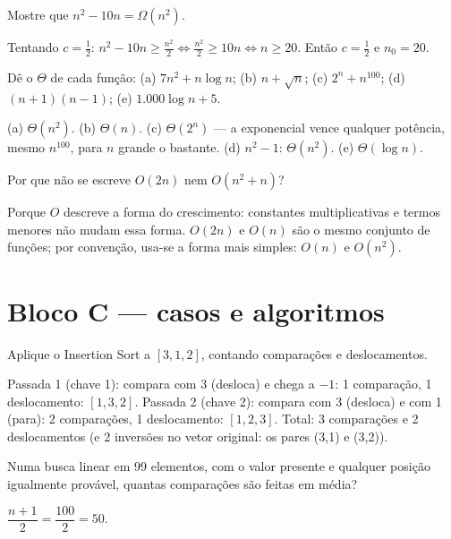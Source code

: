 Mostre que $n^2 - 10n = \Omega(n^2)$.
\begin{resolucao}
Tentando $c = \tfrac{1}{2}$: $n^2 - 10n \ge \tfrac{n^2}{2} \Longleftrightarrow \tfrac{n^2}{2} \ge 10n
\Longleftrightarrow n \ge 20$. Então $c = \tfrac{1}{2}$ e $n_0 = 20$.
\end{resolucao}

Dê o $\Theta$ de cada função: (a) $7n^2 + n\log n$; (b) $n + \sqrt{n}$; (c) $2^n + n^{100}$;
(d) $(n+1)(n-1)$; (e) $1.000\log n + 5$.
\begin{resolucao}
(a) $\Theta(n^2)$. (b) $\Theta(n)$. (c) $\Theta(2^n)$ — a exponencial vence qualquer potência,
mesmo $n^{100}$, para $n$ grande o bastante. (d) $n^2 - 1$: $\Theta(n^2)$. (e) $\Theta(\log n)$.
\end{resolucao}

Por que não se escreve $O(2n)$ nem $O(n^2 + n)$?
\begin{resolucao}
Porque $O$ descreve a forma do crescimento: constantes multiplicativas e termos menores não mudam
essa forma. $O(2n)$ e $O(n)$ são o mesmo conjunto de funções; por convenção, usa-se a forma mais
simples: $O(n)$ e $O(n^2)$.
\end{resolucao}

\section{Bloco C — casos e algoritmos}

Aplique o Insertion Sort a $[3, 1, 2]$, contando comparações e deslocamentos.
\begin{resolucao}
Passada 1 (chave 1): compara com 3 (desloca) e  chega a $-1$: 1 comparação, 1
deslocamento: $[1, 3, 2]$. Passada 2 (chave 2): compara com 3 (desloca) e com 1 (para):
2 comparações, 1 deslocamento: $[1, 2, 3]$. Total: 3 comparações e 2 deslocamentos (e 2
inversões no vetor original: os pares (3,1) e (3,2)).
\end{resolucao}

Numa busca linear em 99 elementos, com o valor presente e qualquer posição igualmente provável,
quantas comparações são feitas em média?
\begin{resolucao}
$\dfrac{n + 1}{2} = \dfrac{100}{2} = 50$.
\end{resolucao}

